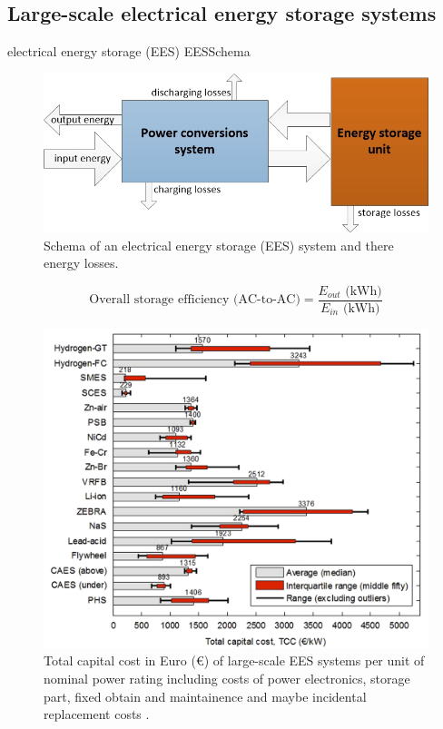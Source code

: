 \subsection{Large-scale electrical energy storage systems}
electrical energy storage (EES)
EESSchema
\begin{figure}[htbp]  
\centering
\includegraphics[width=0.65\linewidth]{FIG/EESSchema}
\caption[Schema of an electrical energy storage (EES) system and there energy losses.]{Schema of an electrical energy storage (EES) system and there energy losses.}\label{TCC_EES}
\end{figure}

\begin{equation}
\textrm{Overall storage efficiency (AC-to-AC)} =\frac{E_{out} \textrm{ (kWh)} }{E_{in} \textrm{ (kWh)}}
\end{equation}

\begin{figure}[htbp]  
\centering
\includegraphics[width=0.75\linewidth]{FIG/TCC_EES}
\caption[Total capital cost in Euro (€) of large-scale EES systems per unit of nominal power rating including costs of power electronics, storage part, fixed obtain and maintainence and maybe incidental replacement costs.]{Total capital cost in Euro (€) of large-scale EES systems per unit of nominal power rating including costs of power electronics, storage part, fixed obtain and maintainence and maybe incidental replacement costs \cite{Zakeri2015}.}\label{TCC_EES}
\end{figure}



